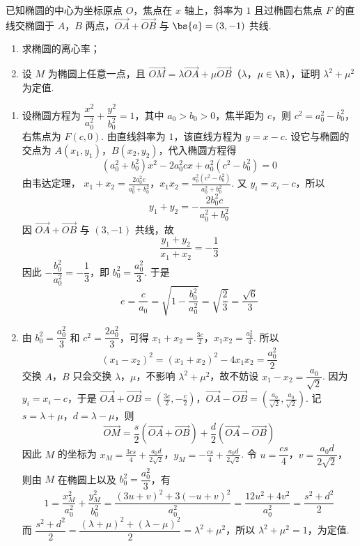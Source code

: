 \begin{problem}
已知椭圆的中心为坐标原点 \(O\)，焦点在 \(x\) 轴上，斜率为 \(1\) 且过椭圆右焦点 \(F\) 的直线交椭圆于 \(A\)，\(B\) 两点，\(\overrightarrow{OA} + \overrightarrow{OB}\) 与 \(\bs{a} = (3, -1)\) 共线.

\begin{enumerate}
\item 求椭圆的离心率；
\item 设 \(M\) 为椭圆上任意一点，且 \(\overrightarrow{OM} = \lambda \overrightarrow{OA} + \mu \overrightarrow{OB}\)（\(\lambda\)，\(\mu \in \R\)），证明 \(\lambda^2 + \mu^2\) 为定值.
\end{enumerate}
\end{problem}

\begin{solution}
\begin{enumerate}
\item 设椭圆方程为 \(\dfrac{x^2}{a_0^2}+\dfrac{y^2}{b_0^2}=1\)，其中 \(a_0>b_0>0\)，焦半距为 \(c\)，则 \(c^2=a_0^2-b_0^2\)，右焦点为 \(F(c,0)\). 由直线斜率为 \(1\)，该直线方程为 \(y=x-c\). 设它与椭圆的交点为 \(A(x_1,y_1)\)，\(B(x_2,y_2)\)，代入椭圆方程得
\[
(a_0^2+b_0^2)x^2-2a_0^2cx+a_0^2(c^2-b_0^2)=0
\]
由韦达定理，
\(x_1+x_2=\frac{2a_0^2c}{a_0^2+b_0^2}\)，\(x_1x_2=\frac{a_0^2(c^2-b_0^2)}{a_0^2+b_0^2}\).
又 \(y_i=x_i-c\)，所以
\[
y_1+y_2=-\frac{2b_0^2c}{a_0^2+b_0^2}
\]
因 \(\overrightarrow{OA}+\overrightarrow{OB}\) 与 \((3,-1)\) 共线，故
\[
\frac{y_1+y_2}{x_1+x_2}=-\frac{1}{3}
\]
因此 \(-\dfrac{b_0^2}{a_0^2}=-\dfrac{1}{3}\)，即 \(b_0^2=\dfrac{a_0^2}{3}\). 于是
\[
e=\frac{c}{a_0}=\sqrt{1-\frac{b_0^2}{a_0^2}}=\sqrt{\frac{2}{3}}=\frac{\sqrt{6}}{3}
\]
\item 由 \(b_0^2=\dfrac{a_0^2}{3}\) 和 \(c^2=\dfrac{2a_0^2}{3}\)，可得
\(x_1+x_2=\frac{3c}{2}\)，\(x_1x_2=\frac{a_0^2}{4}\).
所以
\[
(x_1-x_2)^2=(x_1+x_2)^2-4x_1x_2=\frac{a_0^2}{2}
\]
交换 \(A\)，\(B\) 只会交换 \(\lambda\)，\(\mu\)，不影响 \(\lambda^2+\mu^2\)，故不妨设 \(x_1-x_2=\dfrac{a_0}{\sqrt{2}}\). 因为 \(y_i=x_i-c\)，于是
\(\overrightarrow{OA}+\overrightarrow{OB}=\left(\frac{3c}{2},-\frac{c}{2}\right)\)，\(\overrightarrow{OA}-\overrightarrow{OB}=\left(\frac{a_0}{\sqrt{2}},\frac{a_0}{\sqrt{2}}\right)\).
记 \(s=\lambda+\mu\)，\(d=\lambda-\mu\)，则
\[
\overrightarrow{OM}=\frac{s}{2}\left(\overrightarrow{OA}+\overrightarrow{OB}\right)+\frac{d}{2}\left(\overrightarrow{OA}-\overrightarrow{OB}\right)
\]
因此 \(M\) 的坐标为
\(x_M=\frac{3cs}{4}+\frac{a_0d}{2\sqrt{2}}\)，\(y_M=-\frac{cs}{4}+\frac{a_0d}{2\sqrt{2}}\).
令 \(u=\dfrac{cs}{4}\)，\(v=\dfrac{a_0d}{2\sqrt{2}}\)，则由 \(M\) 在椭圆上以及 \(b_0^2=\dfrac{a_0^2}{3}\)，有
\[
1=\frac{x_M^2}{a_0^2}+\frac{y_M^2}{b_0^2}=\frac{(3u+v)^2+3(-u+v)^2}{a_0^2}=\frac{12u^2+4v^2}{a_0^2}=\frac{s^2+d^2}{2}
\]
而 \(\dfrac{s^2+d^2}{2}=\dfrac{(\lambda+\mu)^2+(\lambda-\mu)^2}{2}=\lambda^2+\mu^2\)，所以 \(\lambda^2+\mu^2=1\)，为定值.
\end{enumerate}
\end{solution}


